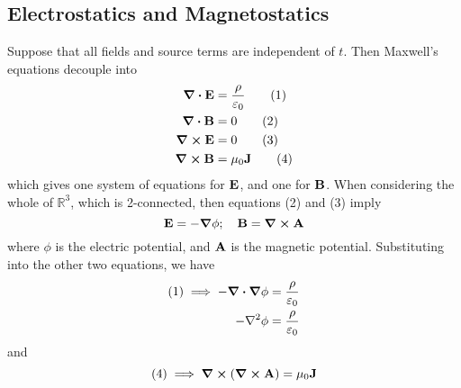 \subsection{Electrostatics and Magnetostatics}
Suppose that all fields and source terms are independent of \(t\).
Then Maxwell's equations decouple into
\begin{align}
	\div{\vb E}  & = \frac{\rho}{\varepsilon_0} \tag{1} \\
	\div{\vb B}  & = 0                          \tag{2} \\
	\curl{\vb E} & = 0                          \tag{3} \\
	\curl{\vb B} & = \mu_0 \vb J \tag{4}
\end{align}
which gives one system of equations for \(\vb E\), and one for \(\vb B\).
When considering the whole of \(\mathbb R^3\), which is 2-connected, then equations (2) and (3) imply
\[
	\vb E = -\grad \phi;\quad \vb B = \curl \vb A
\]
where \(\phi\) is the electric potential, and \(\vb A\) is the magnetic potential.
Substituting into the other two equations, we have
\begin{align*}
	(1) \implies -\div{\grad \phi} & = \frac{\rho}{\varepsilon_0} \\
	-\laplacian \phi               & = \frac{\rho}{\varepsilon_0}
\end{align*}
and
\[
	(4) \implies \curl(\curl{\vb A}) = \mu_0 \vb J
\]

